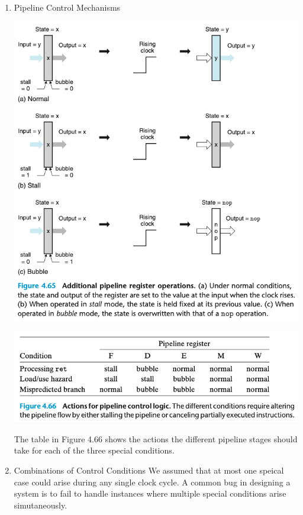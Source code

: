 \documentclass[11pt]{article}
\begin{document}
\begin{enumerate}
\item Pipeline Control Mechanisms
\label{sec:orgb9611b5}

\begin{center}
\includegraphics[width=.9\linewidth]{pics/figure4.65-additional-pipeline-register-operations.png}
\end{center}

\begin{center}
\includegraphics[width=.9\linewidth]{pics/figure4.66-actions-for-pipeline-control-logic.png}
\end{center}

The table in Figure 4.66 shows the actions the different pipeline stages should take for each of the three special conditions.\\

\item Combinations of Control Conditions
\label{sec:orgb895bda}
We assumed that at most one speical case could arise during any single clock cycle. A common bug in designing a system is to fail to handle instances where multiple special conditions arise simutaneously.\\


\end{enumerate}
\end{document}
